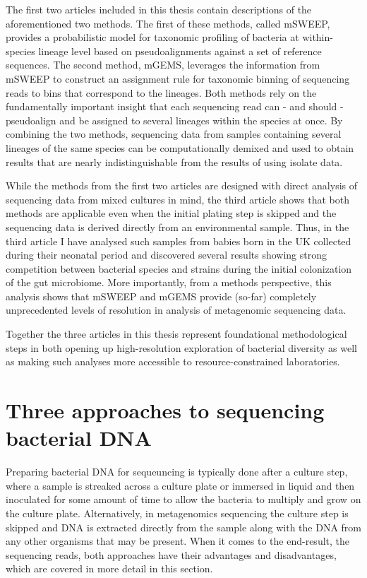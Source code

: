 \documentclass[officiallayout]{tktla}
\begin{document}
The first two articles included in this thesis contain descriptions of
the aforementioned two methods. The first of these methods, called
mSWEEP, provides a probabilistic model for taxonomic profiling of
bacteria at within-species lineage level based on pseudoalignments
against a set of reference sequences. The second method, mGEMS,
leverages the information from mSWEEP to construct an assignment rule
for taxonomic binning of sequencing reads to bins that correspond to
the lineages. Both methods rely on the fundamentally important insight
that each sequencing read can - and should - pseudoalign and be
assigned to several lineages within the species at once. By combining
the two methods, sequencing data from samples containing several
lineages of the same species can be computationally demixed and used
to obtain results that are nearly indistinguishable from the results
of using isolate data.

While the methods from the first two articles are designed with direct
analysis of sequencing data from mixed cultures in mind, the third
article shows that both methods are applicable even when the initial
plating step is skipped and the sequencing data is derived directly
from an environmental sample. Thus, in the third article I have
analysed such samples from babies born in the UK collected during
their neonatal period and discovered several results showing strong
competition between bacterial species and strains during the initial
colonization of the gut microbiome. More importantly, from a methods
perspective, this analysis shows that mSWEEP and mGEMS provide
(so-far) completely unprecedented levels of resolution in analysis of
metagenomic sequencing data.

Together the three articles in this thesis represent foundational
methodological steps in both opening up high-resolution exploration of
bacterial diversity as well as making such analyses more accessible to
resource-constrained laboratories.

\section{Three approaches to sequencing bacterial DNA}


Preparing bacterial DNA for sequeuncing is typically done after a
culture step, where a sample is streaked across a culture plate or
immersed in liquid and then inoculated for some amount of time to
allow the bacteria to multiply and grow on the culture
plate. Alternatively, in metagenomics sequencing the culture step is
skipped and DNA is extracted directly from the sample along with the
DNA from any other organisms that may be present. When it comes to the
end-result, the sequencing reads, both approaches have their
advantages and disadvantages, which are covered in more detail in this
section.
\end{document}
